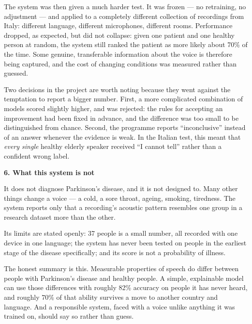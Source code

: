 \documentclass[11pt,a4paper]{report}
\newcommand{\sheadEN}[1]{\par\vspace{4pt}%
\noindent{\color{honest}\rule[0.5ex]{16pt}{2.4pt}}\hspace{7pt}%
{\large\bfseries\color{ink}#1}\par\vspace{2pt}}
\begin{document}
The system was then given a much harder test. It was frozen --- no
retraining, no adjustment --- and applied to a completely different
collection of recordings from Italy: different language, different
microphones, different rooms. Performance dropped, as expected, but
did not collapse: given one patient and one healthy person at random,
the system still ranked the patient as more likely about 70\% of the
time. Some genuine, transferable information about the voice is
therefore being captured, and the cost of changing conditions was
measured rather than guessed.

Two decisions in the project are worth noting because they went
against the temptation to report a bigger number. First, a more
complicated combination of models scored slightly higher, and was
rejected: the rules for accepting an improvement had been fixed in
advance, and the difference was too small to be distinguished from
chance. Second, the programme reports ``inconclusive'' instead of an
answer whenever the evidence is weak. In the Italian test, this meant
that \emph{every single} healthy elderly speaker received ``I cannot
tell'' rather than a confident wrong label.

\sheadEN{6. What this system is not}
It does not diagnose Parkinson's disease, and it is not designed to.
Many other things change a voice --- a cold, a sore throat, ageing,
smoking, tiredness. The system reports only that a recording's
acoustic pattern resembles one group in a research dataset more than
the other.

Its limits are stated openly: 37 people is a small number, all
recorded with one device in one language; the system has never been
tested on people in the earliest stage of the disease specifically;
and its score is not a probability of illness.

The honest summary is this. Measurable properties of speech do differ
between people with Parkinson's disease and healthy people. A simple,
explainable model can use those differences with roughly 82\% accuracy
on people it has never heard, and roughly 70\% of that ability
survives a move to another country and language. And a responsible
system, faced with a voice unlike anything it was trained on, should
say so rather than guess.

\endgroup
\clearpage
\end{document}
